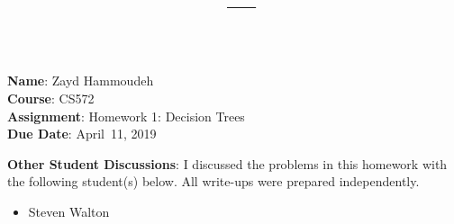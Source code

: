 \documentclass{report}
\title{\textbf{\course\ --- \assnName}}
\author{\name}
\newcommand{\name}{Zayd Hammoudeh}
\newcommand{\course}{CS572}
\newcommand{\assnName}{Homework 1: Decision Trees}
\newcommand{\dueDate}{April~11, 2019}
\begin{document}
  \maketitle

  \noindent
  \textbf{Name}: \name\\
  \textbf{Course}: \course\\
  \textbf{Assignment}: \assnName\\
  \textbf{Due Date}: \dueDate%

  \noindent
  \textbf{Other Student Discussions}: I discussed the problems in this homework with the following student(s) below.  All write-ups were prepared independently.
  \vspace{-1em}
  \begin{itemize}
    \item Steven Walton
  \end{itemize}

  \newpage
  
  
  
\end{document}
